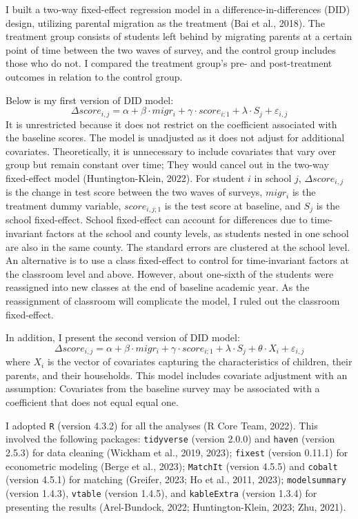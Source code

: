 \documentclass[
  man]{apa7}
\begin{document}
I built a two-way fixed-effect regression model in a difference-in-differences (DID) design, utilizing parental migration as the treatment (Bai et al., 2018). The treatment group consists of students left behind by migrating parents at a certain point of time between the two waves of survey, and the control group includes those who do not. I compared the treatment group's pre- and post-treatment outcomes in relation to the control group.

Below is my first version of DID model: \[\Delta score_{i,j} = \alpha + \beta \cdot migr_{i} + \gamma \cdot score_{i;1} + \lambda \cdot S_{j} + \varepsilon_{i,j}\] It is unrestricted because it does not restrict on the coefficient associated with the baseline scores. The model is unadjusted as it does not adjust for additional covariates. Theoretically, it is unnecessary to include covariates that vary over group but remain constant over time; They would cancel out in the two-way fixed-effect model (Huntington-Klein, 2022). For student \(i\) in school \(j\), \(\Delta score_{i,j}\) is the change in test score between the two waves of surveys, \(migr_{i}\) is the treatment dummy variable, \(score_{i,j;1}\) is the test score at baseline, and \(S_{j}\) is the school fixed-effect. School fixed-effect can account for differences due to time-invariant factors at the school and county levels, as students nested in one school are also in the same county. The standard errors are clustered at the school level. An alternative is to use a class fixed-effect to control for time-invariant factors at the classroom level and above. However, about one-sixth of the students were reassigned into new classes at the end of baseline academic year. As the reassignment of classroom will complicate the model, I ruled out the classroom fixed-effect.

In addition, I present the second version of DID model: \[\Delta score_{i,j} = \alpha + \beta \cdot migr_{i} + \gamma \cdot score_{i;1} + \lambda \cdot S_{j} + \theta \cdot X_{i} + \varepsilon_{i,j}\] where \(X_{i}\) is the vector of covariates capturing the characteristics of children, their parents, and their households. This model includes covariate adjustment with an assumption: Covariates from the baseline survey may be associated with a coefficient that does not equal equal one.

I adopted \texttt{R} (version 4.3.2) for all the analyses (R Core Team, 2022). This involved the following packages: \texttt{tidyverse} (version 2.0.0) and \texttt{haven} (version 2.5.3) for data cleaning (Wickham et al., 2019, 2023); \texttt{fixest} (version 0.11.1) for econometric modeling (Berge et al., 2023); \texttt{MatchIt} (version 4.5.5) and \texttt{cobalt} (version 4.5.1) for matching (Greifer, 2023; Ho et al., 2011, 2023); \texttt{modelsummary} (version 1.4.3), \texttt{vtable} (version 1.4.5), and \texttt{kableExtra} (version 1.3.4) for presenting the results (Arel-Bundock, 2022; Huntington-Klein, 2023; Zhu, 2021).
\end{document}
